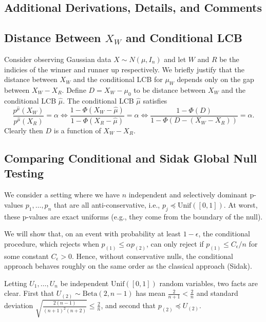 \documentclass{article}
\begin{document}
\begin{appendix}

\section{Additional Derivations, Details, and Comments}

\subsection{Distance Between $X_W$ and Conditional LCB }
\label{sec:gap_appdx}

Consider observing Gaussian data $X \sim N(\mu, I_n)$ and let $W$ and $R$ be the indicies of the winner and runner up respectively. We briefly justify that the distance between $X_W$ and the conditional LCB for $\mu_W$ depends only on the gap between $X_W - X_R$. Define $D = X_W - \mu_0$ to be distance between $X_W$ and the conditional LCB $\hat{\mu}$. The conditional LCB $\hat{\mu}$ satisfies 
\begin{equation*}
    \frac{p^{\hat{\mu}}(X_W)}{p^{\hat{\mu}}(X_R)} = \alpha \iff \frac{1 - \Phi(X_W - \hat{\mu})}{1 - \Phi(X_R - \hat{\mu})} = \alpha \iff \frac{1 - \Phi(D)}{1 - \Phi(D - (X_W - X_R))} =\alpha.
\end{equation*}
Clearly then $D$ is a function of $X_W - X_R$.


\subsection{Comparing Conditional and Sidak Global Null Testing}
\label{sec:beta_dist_appdx}

We consider a setting where we have $n$ independent and selectively dominant p-values $p_1, \dots, p_n$ that are all anti-conservative, i.e.,  $p_j \preceq \text{Unif}([0, 1])$. At worst, these p-values are exact uniforms (e.g., they come from the boundary of the null). 

We will show that, on an event with probability at least $1-\epsilon$, the conditional procedure, which rejects when $p_{(1)} \leq \alpha p_{(2)}$, can only reject if $p_{(1)} \leq C_{\epsilon}/n$ for some constant $C_{\epsilon} > 0$. Hence, without conservative nulls, the conditional approach behaves roughly on the same order as the classical approach (Sidak).   

Letting $U_1, \dots, U_n$ be independent $\text{Unif}([0, 1])$ random variables, two facts are clear. First that $U_{(2)} \sim \text{Beta}(2, n-1)$ has mean $\frac{2}{n + 1} < \frac{2}{n}$ and standard deviation $\sqrt{\frac{2(n-1)}{(n+1)^2(n+2)}} \leq \frac{2}{n}$, and second that $p_{(2)} \preceq U_{(2)}$. 


\end{appendix}
\end{document}
